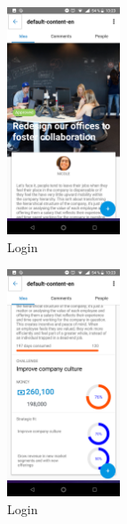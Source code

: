 \begin{figure}[!h]
	\begin{center}
		\includegraphics[width=0.3\textwidth]{./img/anexo1/ver_idea_inicio.png}
		\caption{Login}
		\label{fig:ver_idea_inicio}
	\end{center}
\end{figure}

\begin{figure}[!h]
	\begin{center}
		\includegraphics[width=0.3\textwidth]{./img/anexo1/ver_idea_inicio_cont.png}
		\caption{Login}
		\label{fig:ver_idea_inicio_cont}
	\end{center}
\end{figure}

